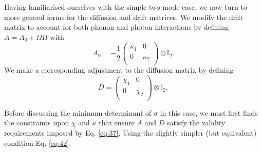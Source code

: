 \documentclass[11pt,a4paper]{article}
\numberwithin{equation}{section}
\begin{document}
	Having familiarised ourselves with the simple two mode case, we now turn to more general forms for the diffusion and drift matrices. We modify the drift matrix to account for both phonon and photon interactions by defining $A = A_0 +\Omega H$ with
	\begin{equation*}
	A_0 = -\frac{1}{2} \begin{pmatrix}
	\kappa_1 & 0\\
	0 & \kappa_{2}\\
	\end{pmatrix} \otimes \mathbb{I}_2.
	\end{equation*} 
	We make a corresponding adjustment to the diffusion matrix by defining
	\begin{equation*}
	D = \begin{pmatrix}
	\chi_1 & 0\\
	0 & \chi_2\\
	\end{pmatrix} \otimes \mathbb{I}_2,
	\end{equation*}
	
	Before discussing the minimum determinant of $\sigma$ in this case, we must first finds the constraints upon $\chi$ and $\kappa$ that ensure $A$ and $D$ satisfy the validity requirements imposed by Eq. \ref{eq:37}. Using the slightly simpler (but equivalent) condition Eq. \ref{eq:42}, 
	
\end{document}
